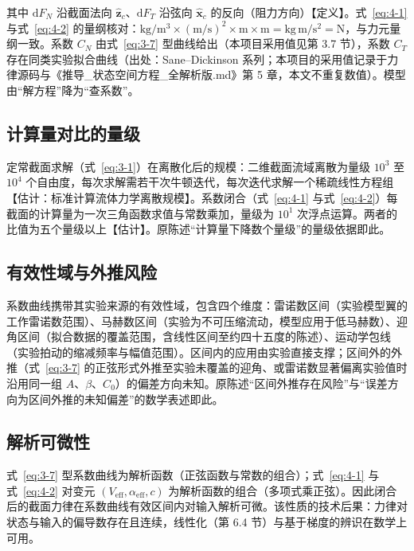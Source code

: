 \documentclass[11pt,a4paper]{ctexart}
\numberwithin{equation}{section}
\begin{document}
其中 $\mathrm{d}F_N$ 沿截面法向 $\hat{\bm{z}}_c$、$\mathrm{d}F_T$ 沿弦向 $\hat{\bm{x}}_c$ 的反向（阻力方向）【定义】。式~\eqref{eq:4-1} 与式~\eqref{eq:4-2} 的量纲核对：$\mathrm{kg/m^3 \times (m/s)^2 \times m \times m = kg\, m/s^2 = N}$，与力元量纲一致。系数 $C_N$ 由式~\eqref{eq:3-7} 型曲线给出（本项目采用值见第 3.7 节），系数 $C_T$ 存在同类实验拟合曲线（出处：Sane--Dickinson 系列；本项目的采用值记录于力律源码与《推导\_状态空间方程\_全解析版.md》第 5 章，本文不重复数值）。模型由“解方程”降为“查系数”。

\subsection{计算量对比的量级}

定常截面求解（式~\eqref{eq:3-1}）在离散化后的规模：二维截面流域离散为量级 $10^3$ 至 $10^4$ 个自由度，每次求解需若干次牛顿迭代，每次迭代求解一个稀疏线性方程组【估计：标准计算流体力学离散规模】。系数闭合（式~\eqref{eq:4-1} 与式~\eqref{eq:4-2}）每截面的计算量为一次三角函数求值与常数乘加，量级为 $10^1$ 次浮点运算。两者的比值为五个量级以上【估计】。原陈述“计算量下降数个量级”的量级依据即此。

\subsection{有效性域与外推风险}

系数曲线携带其实验来源的有效性域，包含四个维度：雷诺数区间（实验模型翼的工作雷诺数范围）、马赫数区间（实验为不可压缩流动，模型应用于低马赫数）、迎角区间（拟合数据的覆盖范围，含线性区间至约四十五度的陈述）、运动学包线（实验拍动的缩减频率与幅值范围）。区间内的应用由实验直接支撑；区间外的外推（式~\eqref{eq:3-7} 的正弦形式外推至实验未覆盖的迎角、或雷诺数显著偏离实验值时沿用同一组 $A$、$\beta$、$C_0$）的偏差方向未知。原陈述“区间外推存在风险”与“误差方向为区间外推的未知偏差”的数学表述即此。

\subsection{解析可微性}

式~\eqref{eq:3-7} 型系数曲线为解析函数（正弦函数与常数的组合）；式~\eqref{eq:4-1} 与式~\eqref{eq:4-2} 对变元 $(V_{\text{eff}}, \alpha_{\text{eff}}, c)$ 为解析函数的组合（多项式乘正弦）。因此闭合后的截面力律在系数曲线有效区间内对输入解析可微。该性质的技术后果：力律对状态与输入的偏导数存在且连续，线性化（第 6.4 节）与基于梯度的辨识在数学上可用。

\end{document}
